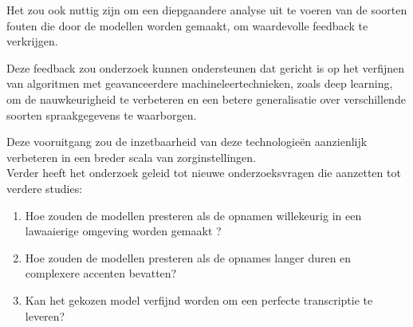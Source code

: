  Het zou ook nuttig zijn om een diepgaandere analyse uit te voeren van de soorten fouten die door de modellen worden gemaakt, om waardevolle feedback te verkrijgen. 
 
 Deze feedback zou onderzoek kunnen ondersteunen dat gericht is op het verfijnen van algoritmen met geavanceerdere machineleertechnieken, zoals deep learning, om de nauwkeurigheid te verbeteren en een betere generalisatie over verschillende soorten spraakgegevens te waarborgen. 
 
 Deze vooruitgang zou de inzetbaarheid van deze technologieën aanzienlijk verbeteren in een breder scala van zorginstellingen.
\\
Verder heeft het onderzoek geleid tot nieuwe onderzoeksvragen die aanzetten tot verdere studies:





\begin{enumerate}[label=\arabic*.]
    
    \item Hoe zouden de modellen presteren als de opnamen willekeurig in een lawaaierige omgeving worden gemaakt ?
    \item Hoe zouden de modellen presteren als de opnames langer duren en complexere accenten bevatten?
    \item Kan het gekozen model verfijnd worden om een perfecte transcriptie te leveren?
    
\end{enumerate}



